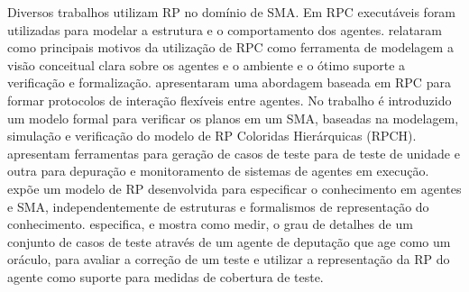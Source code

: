 Diversos trabalhos utilizam RP no domínio de SMA. Em \cite{kohler2001modelling} RPC executáveis foram utilizadas para modelar a estrutura e o comportamento dos agentes. \citet{weyns2002colored} relataram como principais motivos da utilização de RPC como ferramenta de modelagem a visão conceitual clara sobre os agentes e o ambiente e o ótimo suporte a verificação e formalização. \cite{bai2004colored} apresentaram uma abordagem baseada em RPC para formar protocolos de interação flexíveis entre agentes. No trabalho \cite{de2004formal} é introduzido um modelo formal para verificar os planos em um SMA, baseadas na modelagem, simulação e verificação do modelo de RP Coloridas Hierárquicas (RPCH). \cite{poutakidis2009debugging} apresentam ferramentas para geração de casos de teste para de teste de unidade e outra para depuração e monitoramento de sistemas de agentes em execução. \citet{goncalves2010approach} expõe um modelo de RP desenvolvida para especificar o conhecimento em agentes e SMA, independentemente de estruturas e formalismos de representação do conhecimento. \cite{miller2011test} especifica, e mostra como medir, o grau de detalhes de um conjunto de casos de teste através de um agente de deputação que age como um oráculo, para avaliar a correção de um teste e utilizar a representação da RP do agente como suporte para medidas de cobertura de teste.





























